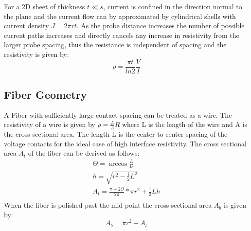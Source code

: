     For a 2D sheet of thickness $t \ll s$, current is confined in the direction normal to the plane and the current flow can by approximated by cylindrical shells with current density $J=2 \pi rt$. As the probe distance increases the number of possible current paths increases and directly cancels any increase in resistivity from the larger probe spacing, thus the resistance is independent of spacing and the resistivity is given by: 
    \begin{equation}
        \rho = \frac{\pi t}{ln2}\frac{V}{I}
    \end{equation}
  
  
\subsection{Fiber Geometry}
A Fiber with sufficiently large contact spacing can be treated as a wire. The resistivity of a wire is given by $\rho = \frac{L}{A}R$
where L is the length of the wire and A is the cross sectional area. The length L is the center to center spacing of the voltage contacts for the ideal case of high interface resistivity. The cross sectional area $A_t$ of the fiber can be derived as follows: \begin{align}
\Theta = \arccos{\frac{L}{D}}    \\
h = \sqrt{r^2-\frac{1}{2}L^2} \\
    A_t = \frac{\pi+2\Theta}{2\pi}*\pi r^2 + \frac{1}{2}Lh\\
\end{align}    
When the fiber is polished past the mid point the cross sectional area $A_b$ is given by: \begin{equation}
    A_b = \pi r^2 -A_t
\end{equation}

